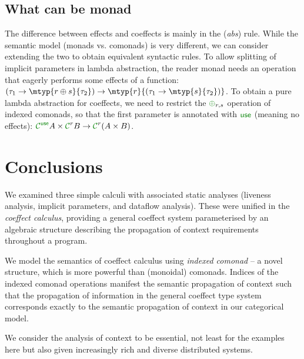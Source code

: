 \subsection{What can be monad}
\label{sec:flat-related-monads}

The difference between effects and coeffects is mainly in the (\emph{abs}) rule. While the 
semantic model (monads vs. comonads) is very different, we can consider extending the two to 
obtain equivalent syntactic rules. To allow splitting of implicit parameters in lambda abstraction, 
the reader monad needs an operation that eagerly performs some effects of a function: 
$(\tau_1 \rightarrow \mtyp{r \oplus s}{\tau_2}) \rightarrow \mtyp{r}{(\tau_1 \rightarrow \mtyp{s}{\tau_2})}$.
To obtain a pure lambda abstraction
for coeffects, we need to restrict the $\cpar_{r, s}$ 
operation of indexed comonads, so that the first parameter is annotated with $\cunit$ (meaning
no effects): $\C^{\cunit} A \times \C^r B \rightarrow \C^{r}(A \times B)$.


\section{Conclusions}

We examined three simple calculi with associated
static analyses (liveness analysis, implicit parameters, and dataflow
analysis). These were unified in the \emph{coeffect calculus},
providing a general coeffect system parameterised by an
algebraic structure describing the propagation of context
requirements throughout a program.

We model the semantics of coeffect calculus using \emph{indexed comonad} -- a novel structure, which
is more powerful than (monoidal) comonads. Indices of the indexed comonad operations manifest the 
semantic propagation of context such that the propagation of information in the general coeffect
type system corresponds exactly to the semantic propagation of context in our categorical model.

We consider the analysis of context to be essential, not least for the examples here but 
also given increasingly rich and diverse distributed systems.
